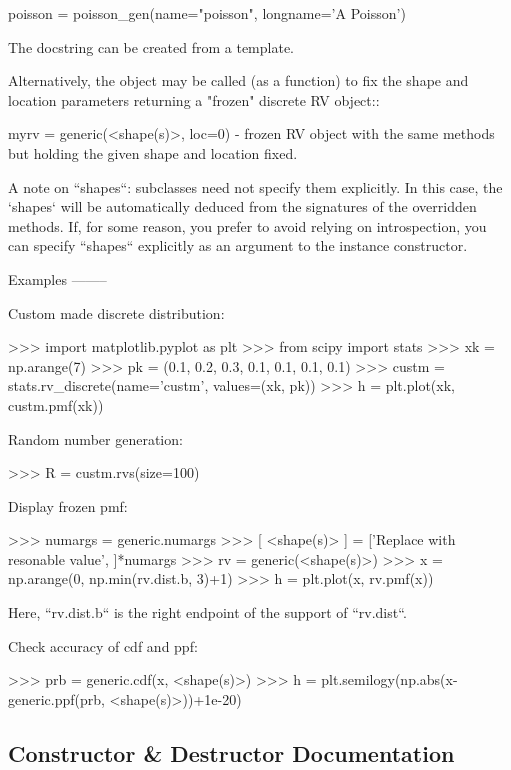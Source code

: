 \begin{DoxyVerb}
    poisson = poisson_gen(name="poisson",
                          longname='A Poisson')

The docstring can be created from a template.

Alternatively, the object may be called (as a function) to fix the shape
and location parameters returning a "frozen" discrete RV object::

    myrv = generic(<shape(s)>, loc=0)
        - frozen RV object with the same methods but holding the given
          shape and location fixed.

A note on ``shapes``: subclasses need not specify them explicitly. In this
case, the `shapes` will be automatically deduced from the signatures of the
overridden methods.
If, for some reason, you prefer to avoid relying on introspection, you can
specify ``shapes`` explicitly as an argument to the instance constructor.


Examples
--------

Custom made discrete distribution:

>>> import matplotlib.pyplot as plt
>>> from scipy import stats
>>> xk = np.arange(7)
>>> pk = (0.1, 0.2, 0.3, 0.1, 0.1, 0.1, 0.1)
>>> custm = stats.rv_discrete(name='custm', values=(xk, pk))
>>> h = plt.plot(xk, custm.pmf(xk))

Random number generation:

>>> R = custm.rvs(size=100)

Display frozen pmf:

>>> numargs = generic.numargs
>>> [ <shape(s)> ] = ['Replace with resonable value', ]*numargs
>>> rv = generic(<shape(s)>)
>>> x = np.arange(0, np.min(rv.dist.b, 3)+1)
>>> h = plt.plot(x, rv.pmf(x))

Here, ``rv.dist.b`` is the right endpoint of the support of ``rv.dist``.

Check accuracy of cdf and ppf:

>>> prb = generic.cdf(x, <shape(s)>)
>>> h = plt.semilogy(np.abs(x-generic.ppf(prb, <shape(s)>))+1e-20)\end{DoxyVerb}
 

\subsection{Constructor \& Destructor Documentation}
\hypertarget{classscipy_1_1stats_1_1__distn__infrastructure_1_1rv__discrete_a0d3c413f475d57cbd9a4f443e02e8568}{}

